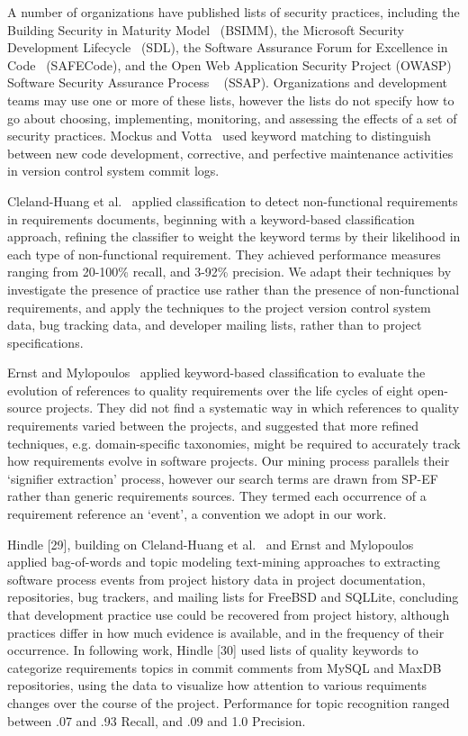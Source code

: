 A number of organizations have published lists of security practices, including the Building Security in Maturity Model~\cite{mcgraw2013bsimm} (BSIMM), the Microsoft Security Development Lifecycle~\cite{howard2009security} (SDL), the Software Assurance Forum for Excellence in Code~\cite{simpson2013fundamental} (SAFECode), and the Open Web Application Security Project (OWASP) Software Security Assurance Process ~\cite{martinez2014ssap} (SSAP). Organizations and development teams may use one or more of these lists, however the lists do not specify how to go about choosing, implementing, monitoring, and assessing the effects of a set of security practices.
Mockus and Votta~\cite{mockus2000identifying} used keyword matching to distinguish between new code development, corrective, and perfective maintenance activities in version control system commit logs.

Cleland-Huang et al.~\cite{clelandhuang2006detection} applied classification to detect non-functional requirements in requirements documents, beginning with a keyword-based classification approach, refining the classifier to weight the keyword terms by their likelihood in each type of non-functional requirement. They achieved performance measures ranging from 20-100\% recall, and 3-92\% precision. We adapt their techniques by investigate the presence of practice use rather than the presence of non-functional requirements, and apply the techniques to the project version control system data, bug tracking data, and developer mailing lists, rather than to project specifications.

Ernst and Mylopoulos~\cite{ernst10refsq} applied keyword-based classification to evaluate the evolution of references to quality requirements over the life cycles of eight open-source projects. They did not find a systematic way in which references to quality requirements varied between the projects, and suggested that more refined techniques, e.g. domain-specific taxonomies, might be required to accurately track how requirements evolve in software projects. Our mining process parallels their `signifier extraction' process, however our search terms are drawn from SP-EF rather than generic requirements sources. They termed each occurrence of a requirement reference an `event', a convention we adopt in our work.

Hindle [29], building on Cleland-Huang et al.~\cite{clelandhuang2006detection} and Ernst and Mylopoulos~\cite{ernst10refsq} applied bag-of-words and topic modeling text-mining approaches to extracting software process events from project history data in project documentation, repositories, bug trackers, and mailing lists for FreeBSD and SQLLite, concluding that development practice use could be recovered from project history, although practices differ in how much evidence is available, and in the frequency of their occurrence. In following work, Hindle [30] used lists of quality keywords to categorize requirements topics in commit comments from MySQL and MaxDB repositories, using the data to visualize how attention to various requiments changes over the course of the project. Performance for topic recognition ranged between .07 and .93 Recall, and .09 and 1.0 Precision. 

